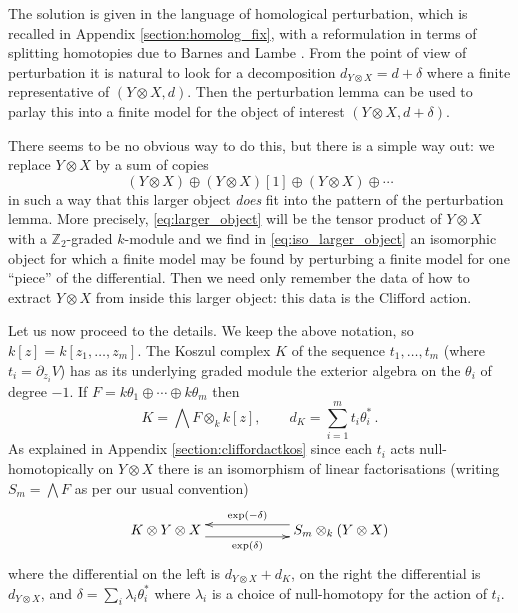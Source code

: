 \documentclass[english,letter paper,12pt,leqno]{article}
\theoremstyle{example}
\numberwithin{equation}{section}
\begin{document}
The solution is given in the language of homological perturbation, which is recalled in Appendix \ref{section:homolog_fix}, with a reformulation in terms of splitting homotopies due to Barnes and Lambe \cite{barneslambe}. From the point of view of perturbation it is natural to look for a decomposition $d_{Y \otimes X} = d + \delta$ where a finite representative of $(Y \otimes X, d)$. Then the perturbation lemma can be used to parlay this into a finite model for the object of interest $(Y \otimes X, d + \delta)$. 

There seems to be no obvious way to do this, but there is a simple way out: we replace $Y \otimes X$ by a sum of copies
\begin{equation}\label{eq:larger_object}
(Y \otimes X) \oplus (Y \otimes X)[1] \oplus (Y \otimes X) \oplus \cdots
\end{equation}
in such a way that this larger object \emph{does} fit into the pattern of the perturbation lemma. More precisely, \eqref{eq:larger_object} will be the tensor product of $Y \otimes X$ with a $\mathbb{Z}_2$-graded $k$-module and we find in \eqref{eq:iso_larger_object} an isomorphic object for which a finite model may be found by perturbing a finite model for one ``piece'' of the differential. Then we need only remember the data of how to extract $Y \otimes X$ from inside this larger object: this data is the Clifford action.
\medskip

Let us now proceed to the details. We keep the above notation, so $k[z] = k[z_1,\ldots,z_m]$. The Koszul complex $K$ of the sequence $t_1,\ldots,t_m$ (where $t_i = \partial_{z_i} V$) has as its underlying graded module the exterior algebra on the $\theta_i$ of degree $-1$. If $F = k\theta_1 \oplus \cdots \oplus k\theta_m$ then
\begin{equation}\label{defn:koszul}
K = \bigwedge F \otimes_k k[z], \qquad d_K = \sum_{i=1}^m t_i \theta_i^*\,.
\end{equation}
As explained in Appendix \ref{section:cliffordactkos} since each $t_i$ acts null-homotopically on $Y \otimes X$ there is an isomorphism of linear factorisations (writing $S_m = \bigwedge F$ as per our usual convention)
\begin{equation}\label{eq:iso_larger_object}
\xymatrix@C+3pc{ K \otimes Y \otimes X \ar@<-1ex>[r]_-{ \exp(\delta) } & S_m \otimes_k (Y \otimes X)\ar@<-1ex>[l]_-{ \exp(-\delta) } }
\end{equation}
where the differential on the left is $d_{Y \otimes X} + d_K$, on the right the differential is $d_{Y \otimes X}$, and $\delta = \sum_i \lambda_i \theta_i^*$ where $\lambda_i$ is a choice of null-homotopy for the action of $t_i$. 
\end{document}
